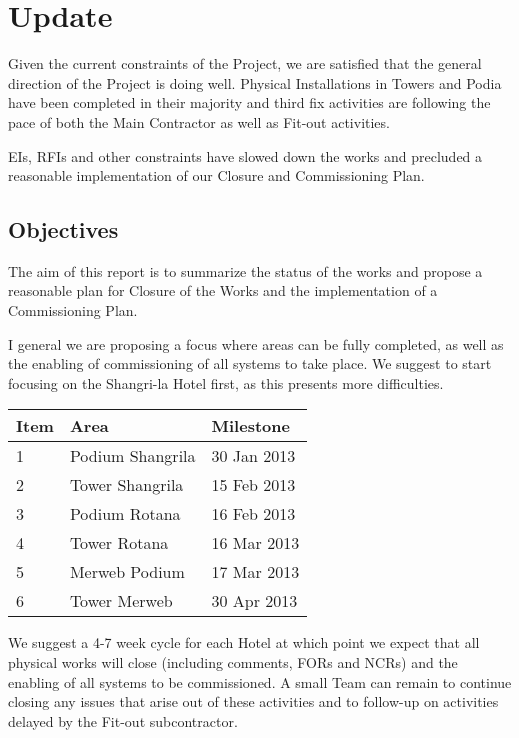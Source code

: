 
\cleardoublepage

\chapter*{Update}

Given the current constraints of the Project, we are satisfied that the general direction of the Project is doing well. Physical Installations in Towers and Podia have been completed in their majority and third fix activities are following the pace of both the Main Contractor as well as Fit-out activities. 

EIs, RFIs and other constraints have slowed down the works and precluded a reasonable implementation of our Closure and Commissioning Plan.

\section*{Objectives}

The aim of this report is to summarize the status of the works
and propose a reasonable plan for Closure of the Works and the implementation of a Commissioning Plan.

I general we are proposing a focus where areas can be fully completed, as well as the enabling of commissioning of all systems to take place. We suggest to start focusing on the
Shangri-la Hotel first, as this presents more difficulties.

\begin{longtable}{lll}
\toprule
Item  &Area   & Milestone \\
\midrule
1     & Podium Shangrila & 30 Jan 2013\\
2     & Tower Shangrila  & 15 Feb 2013\\
3     & Podium Rotana    & 16 Feb 2013\\
4     & Tower Rotana     & 16 Mar 2013\\
5     & Merweb Podium    & 17 Mar 2013\\
6     & Tower Merweb     & 30 Apr 2013\\
\bottomrule
\end{longtable}

We suggest a 4-7 week cycle for each Hotel at which point we expect that all physical works will close (including comments, FORs and NCRs) and the enabling of all systems to be commissioned. A small Team can remain to continue closing any issues that arise out of these activities and to follow-up on activities delayed by the Fit-out subcontractor.

